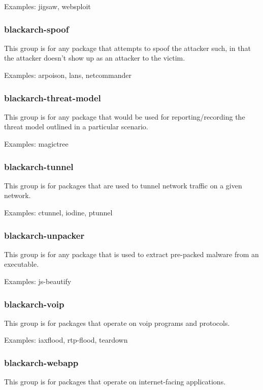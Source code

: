 \documentclass[a4paper, oneside, 11pt]{book}
\begin{document}
Examples: jigsaw, websploit

\subsubsection{blackarch-spoof}

This group is for any package that attempts to spoof the attacker such, in that the attacker doesn't show up as an attacker to the victim.

Examples: arpoison, lans, netcommander

\subsubsection{blackarch-threat-model}

This group is for any package that would be used for reporting/recording the threat model outlined in a particular scenario.

Examples: magictree

\subsubsection{blackarch-tunnel}

This group is for packages that are used to tunnel network traffic on a given network.

Examples: ctunnel, iodine, ptunnel

\subsubsection{blackarch-unpacker}

This group is for any package that is used to extract pre-packed malware from an executable.

Examples: js-beautify

\subsubsection{blackarch-voip}

This group is for packages that operate on voip programs and protocols.

Examples: iaxflood, rtp-flood, teardown

\subsubsection{blackarch-webapp}

This group is for packages that operate on internet-facing applications.
\end{document}
